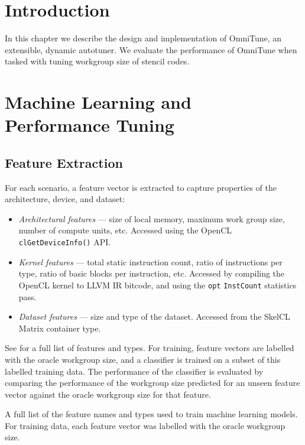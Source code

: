 \section{Introduction}

In this chapter we describe the design and implementation of OmniTune,
an extensible, dynamic autotuner. We evaluate the performance of
OmniTune when tasked with tuning workgroup size of stencil codes.


\section{Machine Learning and Performance Tuning}



\subsection{Feature Extraction}

For each scenario, a feature vector is extracted to capture properties
of the architecture, device, and dataset:

\begin{itemize}
\item \emph{Architectural features} --- size of local memory, maximum
  work group size, number of compute units, etc. Accessed using the
  OpenCL \texttt{clGetDeviceInfo()} API.
\item \emph{Kernel features} --- total static instruction count, ratio
  of instructions per type, ratio of basic blocks per instruction,
  etc. Accessed by compiling the OpenCL kernel to LLVM IR bitcode, and
  using the \texttt{opt} \texttt{InstCount} statistics pass.
\item \emph{Dataset features} --- size and type of the
  dataset. Accessed from the SkelCL Matrix container type.
\end{itemize}

See  for a full list of features and types. For
training, feature vectors are labelled with the oracle workgroup size,
and a classifier is trained on a subset of this labelled training
data. The performance of the classifier is evaluated by comparing the
performance of the workgroup size predicted for an unseen feature
vector against the oracle workgroup size for that feature.

A full list of the feature names and types used to train machine
learning models. For training data, each feature vector was labelled
with the oracle workgroup size.

